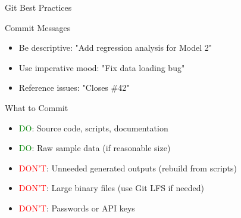 \documentclass[11pt,aspectratio=169]{beamer}
\begin{document}
\begin{frame}{Git Best Practices}
\begin{block}{Commit Messages}
\begin{itemize}
    \item Be descriptive: "Add regression analysis for Model 2"
    \item Use imperative mood: "Fix data loading bug"
    \item Reference issues: "Closes \#42"
\end{itemize}
\end{block}

\begin{block}{What to Commit}
\begin{itemize}
    \item \textcolor{green}{DO}: Source code, scripts, documentation
    \item \textcolor{green}{DO}: Raw sample data (if reasonable size)
    \item \textcolor{red}{DON'T}: Unneeded generated outputs (rebuild from scripts)
    \item \textcolor{red}{DON'T}: Large binary files (use Git LFS if needed)
    \item \textcolor{red}{DON'T}: Passwords or API keys
\end{itemize}
\end{block}

\end{frame}
\end{document}
